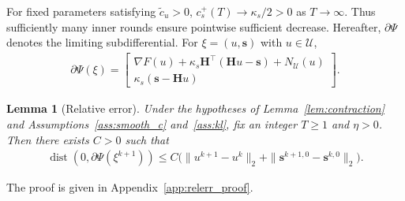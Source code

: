 \documentclass[letterpaper, 10 pt, conference]{ieeeconf} %
\newtheorem{lemma}{Lemma}
\DeclareMathOperator{\dist}{dist}
\begin{document}
For fixed parameters satisfying \(\tilde c_u>0\), \(c_s^{+}(T)\to\kappa_s/2>0\) as \(T\to\infty\). Thus sufficiently many inner rounds ensure pointwise sufficient decrease. Hereafter, \(\partial\Psi\) denotes the limiting subdifferential. For \(\xi=(u,\mathbf s)\) with \(u\in\mathcal U\),
\begin{align}
\partial\Psi(\xi)
=
\begin{bmatrix}
\nabla F(u)
+\kappa_s\mathbf H^\top(\mathbf H u-\mathbf s)
+N_{\mathcal U}(u)
\\[1mm]
\kappa_s(\mathbf s-\mathbf H u)
\end{bmatrix}.
\label{eq:Psi_subdiff}
\end{align}

\begin{lemma}[Relative error]
\label{lem:relerr_conf}
Under the hypotheses of Lemma~\ref{lem:contraction} and Assumptions~\ref{ass:smooth_c} and~\ref{ass:kl}, fix an integer \(T\ge1\) and \(\eta>0\). Then there exists \(C>0\) such that
\begin{align}
\dist(0,\partial\Psi(\xi^{k+1}))
\le
C\Big(
\|u^{k+1}-u^k\|_2
+
\|\mathbf{s}^{k+1,0}-\mathbf{s}^{k,0}\|_2
\Big).
\end{align}
\end{lemma}
The proof is given in Appendix~\ref{app:relerr_proof}.
\end{document}
